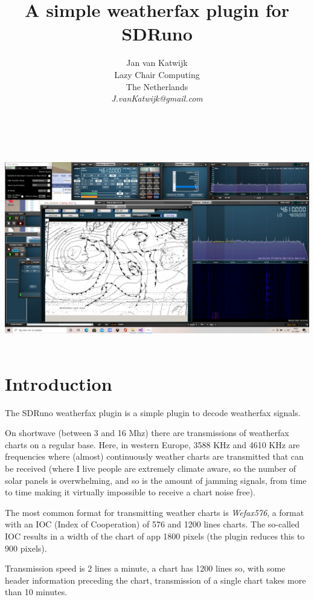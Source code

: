 \documentclass[11pt]{article}
\begin{document}
\title{A simple weatherfax plugin for SDRuno}
\author{
Jan van Katwijk\\
Lazy Chair Computing \\
The Netherlands\\
{\em J.vanKatwijk@gmail.com}}
\maketitle
\ \\
\ \\
\includegraphics[width=150mm]{wfax-example.png}
\ \\
\section{Introduction}
The SDRuno weatherfax plugin is a simple plugin to decode weatherfax signals.

On shortwave (between 3 and 16 Mhz) there are
transmissions of weatherfax charts on a regular base.
Here, in western Europe, 3588 KHz and 4610 KHz are frequencies where
(almost) continuously weather charts are transmitted that can be received
(where I live people are extremely climate aware, so the number of
solar panels is overwhelming, and so is the amount of jamming signals,
from time to time making it virtually impossible
to receive a chart noise free).

The most common format for transmitting weather charts is
{\em Wefax576}, a format with an IOC (Index of Cooperation)
of 576 and 1200 lines charts.
The so-called IOC results in a width of the chart of
app 1800 pixels (the plugin reduces this to 900 pixels).

Transmission speed is 2 lines a minute, a chart has 1200 lines
so, with some header information preceding the chart, transmission
of a single chart takes more than 10 minutes.
\end{document}
